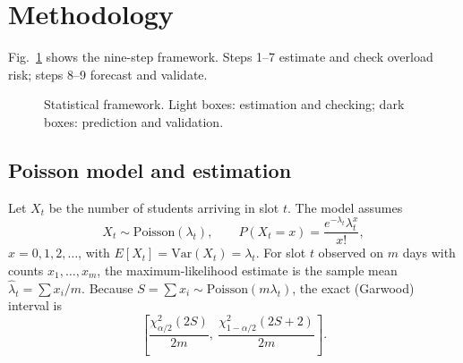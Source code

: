 \documentclass[conference,a4paper]{IEEEtran}
\begin{document}
\section{Methodology}\label{sec:method}
Fig.~\ref{fig:framework} shows the nine-step framework. Steps 1--7 estimate and check overload risk; steps 8--9 forecast
and validate.

\begin{figure}[t]
\centering
{}
\caption{Statistical framework. Light boxes: estimation and checking; dark boxes: prediction and validation.}
\label{fig:framework}
\end{figure}

\subsection{Poisson model and estimation}
Let $X_t$ be the number of students arriving in slot $t$. The model assumes
\begin{equation}
X_t \sim \mathrm{Poisson}(\lambda_t),\qquad P(X_t = x) = \frac{e^{-\lambda_t}\lambda_t^{x}}{x!},
\end{equation}
$x = 0, 1, 2, \dots$, with $E[X_t] = \mathrm{Var}(X_t) = \lambda_t$.
For slot $t$ observed on $m$ days with counts $x_1,\dots,x_m$, the maximum-likelihood estimate is the sample mean
$\hat\lambda_t = \sum x_i / m$. Because $S = \sum x_i \sim \mathrm{Poisson}(m\lambda_t)$, the exact (Garwood) interval
is~\cite{garwood1936}
\begin{equation}
\left[\frac{\chi^2_{\alpha/2}(2S)}{2m},\ \frac{\chi^2_{1-\alpha/2}(2S+2)}{2m}\right].
\end{equation}
\end{document}
